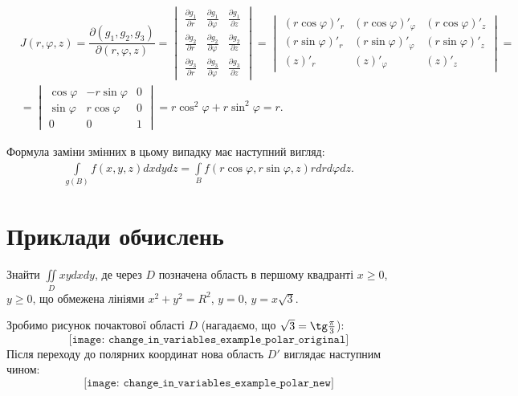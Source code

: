 \begin{align*}
&J(r, \varphi, z) = \dfrac{\partial\left(g_1,g_2,g_3\right)}{\partial\left(r,\varphi,z\right)} =
\begin{vmatrix}
\frac{\partial g_1}{\partial r} & \frac{\partial g_1}{\partial \varphi} & \frac{\partial g_1}{\partial z}\\[6pt]\frac{\partial g_2}{\partial r} & \frac{\partial g_2}{\partial \varphi} & \frac{\partial g_2}{\partial z}\\[6pt]\frac{\partial g_3}{\partial r} & \frac{\partial g_3}{\partial \varphi} & \frac{\partial g_3}{\partial z}
\end{vmatrix}
=
\begin{vmatrix}
\left(r \cos \varphi\right)'_{r} & \left(r \cos \varphi\right)'_{\varphi} & \left(r \cos \varphi\right)'_{z}\\[6pt]
\left(r \sin \varphi\right)'_{r} & \left(r \sin \varphi\right)'_{\varphi} & \left(r \sin \varphi\right)'_{z}\\[6pt]
\left(z \right)'_{r} & \left(z \right)'_{\varphi} & \left(z\right)'_{z}\end{vmatrix} = & \\[6pt]
&=
\begin{vmatrix}
 \cos \varphi & - r \sin \varphi & 0\\[6pt]
 \sin \varphi & r \cos \varphi & 0\\[6pt]
0 & 0 & 1
\end{vmatrix}
= r \cos^2 \varphi + r \sin^2 \varphi = r.
\end{align*}

Формула заміни змінних в цьому випадку має наступний вигляд:
\begin{align*}
\boxed{\int\limits_{g\left(B\right)} f(x, y, z) dx dy dz = \int\limits_{B} f\left(r \cos\varphi, r \sin\varphi, z \right) r dr d\varphi dz.}
\end{align*}
\chapter{Приклади обчислень}
\begin{example}
Знайти ${\iint\limits_D x y d x d y}$, де через $D$ позначена область в першому квадранті ${x\geq0}$, ${y\geq0}$, що обмежена лініями ${x^2 +y^2 = R^2}$, ${y= 0}$, ${y = x\sqrt{3}}$.
\end{example}
Зробимо рисунок почактової області $D$ (нагадаємо, що ${\sqrt{3} = \tg \frac{\pi}{3}}$):
\[
\texttt{[image: change\_in\_variables\_example\_polar\_original]}
\]
Після переходу до полярних координат нова область $D'$ виглядає наступним чином:
\[
\texttt{[image: change\_in\_variables\_example\_polar\_new]}
\]

